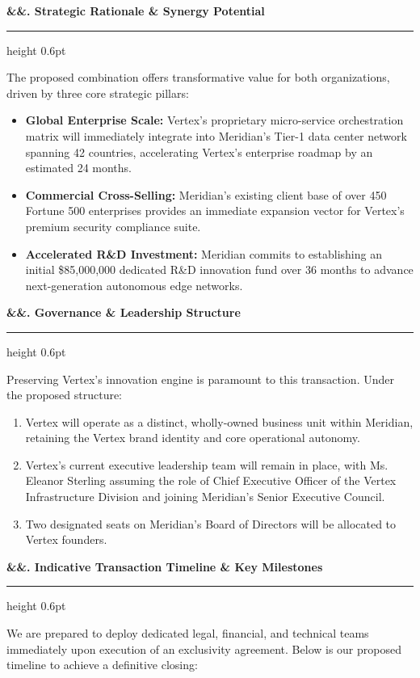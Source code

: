 \documentclass[
  paper=a4,
  fontsize=10pt,
  foldmarks=true,
  foldmarks=BmLNT,
  fromalign=right,
  fromrule=false,
  parskip=half,
  locfield=wide
]{scrlttr2}
\newcommand{\lettersection}[2][]{%
  \vspace{1.8mm}%
  {\noindent\large\sffamily\bfseries\color{ExecutiveNavy}%
  \ifx&#1&\else\color{AccentGold}#1\quad\fi#2}%
  \par\vspace{0.8mm}%
  {\color{AccentGold}\hrule height 0.6pt}%
  \vspace{1.2mm}%
}
\begin{document}
\begin{letter}
\lettersection[\faLayerGroup]{1. Strategic Rationale \& Synergy Potential}
The proposed combination offers transformative value for both organizations, driven by three core strategic pillars:
\begin{itemize}\setlength{\itemsep}{1.5pt}
  \item[\color{ExecutiveNavy}\faChevronRight] \textbf{Global Enterprise Scale:} Vertex's proprietary micro-service orchestration matrix will immediately integrate into Meridian's Tier-1 data center network spanning 42 countries, accelerating Vertex's enterprise roadmap by an estimated 24 months.
  \item[\color{ExecutiveNavy}\faChevronRight] \textbf{Commercial Cross-Selling:} Meridian's existing client base of over 450 Fortune 500 enterprises provides an immediate expansion vector for Vertex's premium security compliance suite.
  \item[\color{ExecutiveNavy}\faChevronRight] \textbf{Accelerated R\&D Investment:} Meridian commits to establishing an initial \$85,000,000 dedicated R\&D innovation fund over 36 months to advance next-generation autonomous edge networks.
\end{itemize}

\newpage %

\lettersection[\faUsers]{2. Governance \& Leadership Structure}
Preserving Vertex's innovation engine is paramount to this transaction. Under the proposed structure:
\begin{enumerate}\setlength{\itemsep}{1.5pt}
  \item Vertex will operate as a distinct, wholly-owned business unit within Meridian, retaining the Vertex brand identity and core operational autonomy.
  \item Vertex's current executive leadership team will remain in place, with Ms. Eleanor Sterling assuming the role of Chief Executive Officer of the Vertex Infrastructure Division and joining Meridian's Senior Executive Council.
  \item Two designated seats on Meridian's Board of Directors will be allocated to Vertex founders.
\end{enumerate}

\lettersection[\faCalendar]{3. Indicative Transaction Timeline \& Key Milestones}
We are prepared to deploy dedicated legal, financial, and technical teams immediately upon execution of an exclusivity agreement. Below is our proposed timeline to achieve a definitive closing:


\end{letter}
\end{document}
